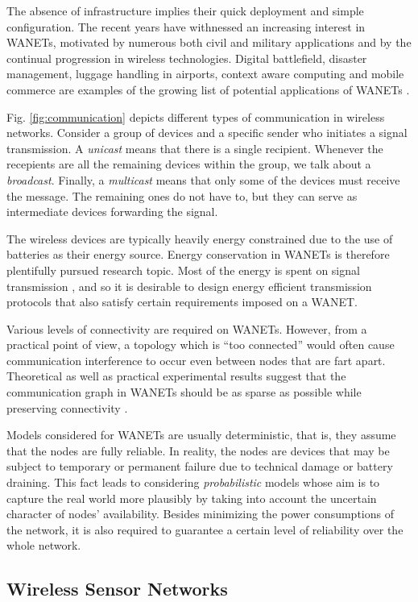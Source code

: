 The absence of infrastructure implies their quick deployment and simple configuration.
The recent years have withnessed an increasing interest in WANETs, motivated by numerous both civil and military applications and by the continual progression in wireless technologies.
Digital battlefield, disaster management, luggage handling in airports, context aware computing and mobile commerce are examples of the growing list of potential applications of WANETs \cite{younis06}.

Fig. \ref{fig:communication} depicts different types of communication in wireless networks.
Consider a group of devices and a specific sender who initiates a signal transmission. 
A \emph{unicast} means that there is a single recipient.
Whenever the recepients are all the remaining devices within the group, we talk about a \emph{broadcast}.
Finally, a \emph{multicast} means that only some of the devices must receive the message. 
The remaining ones do not have to, but they can serve as intermediate devices forwarding the signal.

The wireless devices are typically heavily energy constrained due to the use of batteries as their energy source.
Energy conservation in WANETs is therefore plentifully pursued research topic.
Most of the energy is spent on signal transmission \cite{halgamuge09}, 
and so it is desirable to design energy efficient transmission protocols that also satisfy certain requirements imposed on a WANET.

Various levels of connectivity are required on WANETs.
However, from a practical point of view, a topology which is ``too connected'' would often cause communication interference to occur even between nodes that are fart apart.
Theoretical as well as practical experimental results suggest that the communication graph in WANETs should be as sparse as possible while preserving connectivity \cite{blough02}.

Models considered for WANETs are usually deterministic, that is, they assume that the nodes are fully reliable. 
In reality, the nodes are devices that may be subject to temporary or permanent failure due to technical damage or battery draining.
This fact leads to considering \emph{probabilistic} models whose aim is to capture the real world more plausibly by taking into account the uncertain character of nodes' availability.
Besides minimizing the power consumptions of the network, it is also required to guarantee a certain level of reliability over the whole network.

\subsection{Wireless Sensor Networks}

